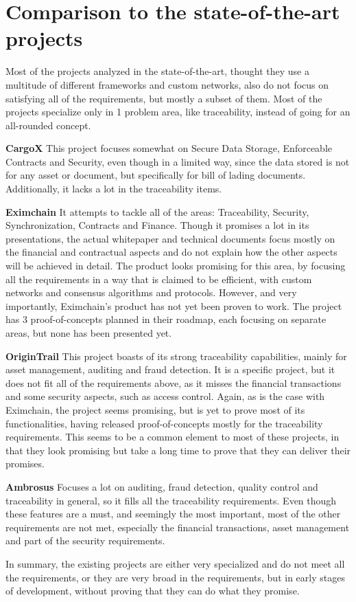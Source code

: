 
\section{Comparison to the state-of-the-art projects}
Most of the projects analyzed in the state-of-the-art, thought they use a multitude of different frameworks and custom networks, also do not focus on satisfying all of the requirements, but mostly a subset of them. Most of the projects specialize only in 1 problem area, like traceability, instead of going for an all-rounded concept.

\par \textbf{CargoX} This project focuses somewhat on Secure Data Storage, Enforceable Contracts and Security, even though in a limited way, since the data stored is not for any asset or document, but specifically for bill of lading documents. Additionally, it lacks a lot in the traceability items.

\par \textbf{Eximchain} It attempts to tackle all of the areas: Traceability, Security, Synchronization, Contracts and Finance. Though it promises a lot in its presentations, the actual whitepaper and technical documents focus mostly on the financial and contractual aspects and do not explain how the other aspects will be achieved in detail. The product looks promising for this area, by focusing all the requirements in a way that is claimed to be efficient, with custom networks and consensus algorithms and protocols. However, and very importantly, Eximchain's product has not yet been proven to work. The project has 3 proof-of-concepts planned in their roadmap, each focusing on separate areas, but none has been presented yet.

\par \textbf{OriginTrail} This project boasts of its strong traceability capabilities, mainly for asset management, auditing and fraud detection. It is a specific project, but it does not fit all of the requirements above,  as it misses the financial transactions and some security aspects, such as access control. Again, as is the case with Eximchain, the project seems promising, but is yet to prove most of its functionalities, having released proof-of-concepts mostly for the traceability requirements. This seems to be a common element to most of these projects, in that they look promising but take a long time to prove that they can deliver their promises.

\par \textbf{Ambrosus} Focuses a lot on auditing, fraud detection, quality control and traceability in general, so it fills all the traceability requirements. Even though these features are a must, and seemingly the most important, most of the other requirements are not met, especially the financial transactions, asset management and part of the security requirements.

In summary, the existing projects are either very specialized and do not meet all the requirements, or they are very broad in the requirements, but in early stages of development, without proving that they can do what they promise.